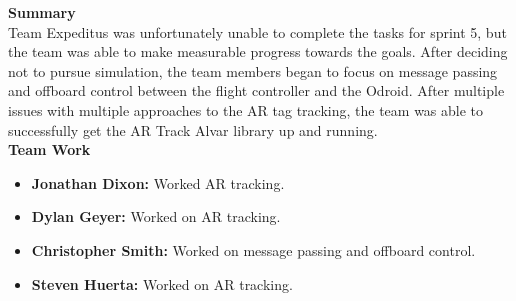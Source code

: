 \noindent \Large{\textbf{Summary}}\\
\normalsize Team Expeditus was unfortunately unable to complete the tasks for sprint 5, but the team was able to make measurable progress towards the goals. After deciding not to pursue simulation, the team members began to focus on message passing and offboard control between the flight controller and the Odroid. After multiple issues with multiple approaches to the AR tag tracking, the team was able to successfully get the AR Track Alvar library up and running.
\vspace{5mm}
\\
\noindent \Large{\textbf{Team Work}}
\normalsize
\begin{itemize}
\item \textbf{Jonathan Dixon:} Worked AR tracking.
\item \textbf{Dylan Geyer:} Worked on AR tracking.
\item \textbf{Christopher Smith:} Worked on message passing and offboard control. 
\item \textbf{Steven Huerta:} Worked on AR tracking. 
\end{itemize}

